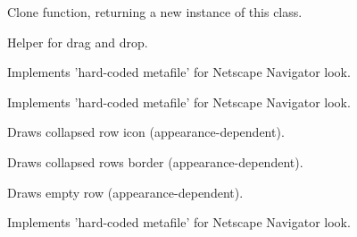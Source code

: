 
Clone function, returning a new instance of this class.


\label{cbrowdragplugincollapserow}


Helper for drag and drop.


\label{cbrowdragplugindraw3dpattern}


Implements 'hard-coded metafile' for Netscape Navigator look.


\label{cbrowdragplugindraw3drect}


Implements 'hard-coded metafile' for Netscape Navigator look.


\label{cbrowdragplugindrawcollapsedrowicon}


Draws collapsed row icon (appearance-dependent).


\label{cbrowdragplugindrawcollapsedrowsborder}


Draws collapsed rows border (appearance-dependent).


\label{cbrowdragplugindrawemptyrow}


Draws empty row (appearance-dependent).


\label{cbrowdragplugindrawortoromb}


Implements 'hard-coded metafile' for Netscape Navigator look.


\label{cbrowdragplugindrawrectshade}

